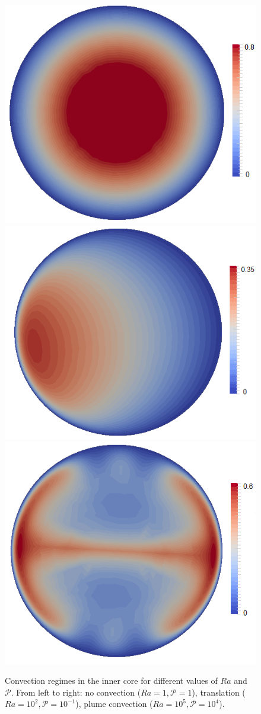 \documentclass{article}
\begin{document}
\begin{figure}
    \begin{center}
    \includegraphics[width=0.25\linewidth]{cookbooks/inner_core_convection/Ra1e0P0rescalemodif.png}
    \includegraphics[width=0.25\linewidth]{cookbooks/inner_core_convection/Ra1e2P-1rescalemodif.png}
    \includegraphics[width=0.25\linewidth]{cookbooks/inner_core_convection/Ra1e5P4rescalemodif.png}
    \caption{Convection regimes in the inner core for different values of $Ra$ and $\mathcal{P}$. From left to right: no convection ($Ra=1, \mathcal{P}=1$), translation ($Ra=10^2, \mathcal{P}=10^{-1}$), plume convection ($Ra=10^5, \mathcal{P}=10^4$).}
    \label{fig:inner-core-regimes}
       \end{center}
\end{figure}
\end{document}

